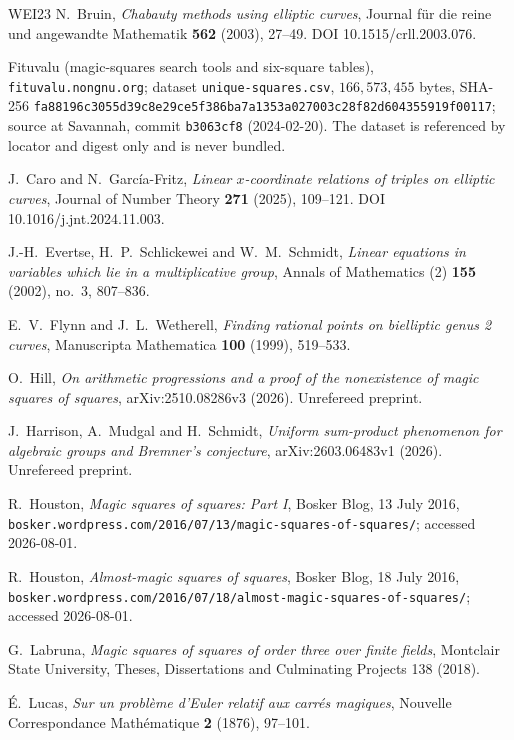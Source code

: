 \begin{thebibliography}{WEI23}
 N.~Bruin, \emph{Chabauty methods using elliptic
curves}, Journal f\"ur die reine und angewandte Mathematik \textbf{562}
(2003), 27--49. DOI 10.1515/crll.2003.076.

 Fituvalu (magic-squares search tools and six-square
tables), \texttt{fituvalu.nongnu.org}; dataset
\texttt{unique-squares.csv}, $166{,}573{,}455$ bytes, SHA-256
\texttt{fa88196c3055d39c8e29ce5f386ba7a1353a027003c28f82d604355919f00117};
source at Savannah, commit \texttt{b3063cf8} (2024-02-20). The dataset is
referenced by locator and digest only and is never bundled.

 J.~Caro and N.~Garc\'ia-Fritz, \emph{Linear
$x$-coordinate relations of triples on elliptic curves}, Journal of Number
Theory \textbf{271} (2025), 109--121. DOI 10.1016/j.jnt.2024.11.003.

 J.-H.~Evertse, H.~P.~Schlickewei and
W.~M.~Schmidt, \emph{Linear equations in variables which lie in a
multiplicative group}, Annals of Mathematics (2) \textbf{155} (2002),
no.~3, 807--836.

 E.~V.~Flynn and J.~L.~Wetherell, \emph{Finding
rational points on bielliptic genus 2 curves}, Manuscripta Mathematica
\textbf{100} (1999), 519--533.

 O.~Hill, \emph{On arithmetic progressions and a
proof of the nonexistence of magic squares of squares},
arXiv:2510.08286v3 (2026). Unrefereed preprint.

 J.~Harrison, A.~Mudgal and H.~Schmidt,
\emph{Uniform sum-product phenomenon for algebraic groups and Bremner's
conjecture}, arXiv:2603.06483v1 (2026). Unrefereed preprint.

 R.~Houston, \emph{Magic squares of squares:
Part I}, Bosker Blog, 13 July 2016,
\texttt{bosker.wordpress.com/2016/07/13/magic-squares-of-squares/};
accessed 2026-08-01.

 R.~Houston, \emph{Almost-magic squares of
squares}, Bosker Blog, 18 July 2016,
\texttt{bosker.wordpress.com/2016/07/18/almost-magic-squares-of-squares/};
accessed 2026-08-01.

 G.~Labruna, \emph{Magic squares of squares of order
three over finite fields}, Montclair State University, Theses,
Dissertations and Culminating Projects 138 (2018).

 \'E.~Lucas, \emph{Sur un probl\`eme d'Euler relatif
aux carr\'es magiques}, Nouvelle Correspondance Math\'ematique \textbf{2}
(1876), 97--101.


\end{thebibliography}
